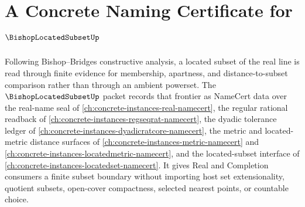 \chapter{A Concrete Naming Certificate for $\BishopLocatedSubsetUp$}
\label{ch:concrete-instances-bishop-located-subset-namecert}

Following Bishop--Bridges constructive analysis, a located subset of the real line is read through finite evidence for membership, apartness, and distance-to-subset comparison rather than through an ambient powerset. The $\BishopLocatedSubsetUp$ packet records that frontier as NameCert data over the real-name seal of \autoref{ch:concrete-instances-real-namecert}, the regular rational readback of \autoref{ch:concrete-instances-regseqrat-namecert}, the dyadic tolerance ledger of \autoref{ch:concrete-instances-dyadicratcore-namecert}, the metric and located-metric distance surfaces of \autoref{ch:concrete-instances-metric-namecert} and \autoref{ch:concrete-instances-locatedmetric-namecert}, and the located-subset interface of \autoref{ch:concrete-instances-locatedset-namecert}. It gives Real and Completion consumers a finite subset boundary without importing host set extensionality, quotient subsets, open-cover compactness, selected nearest points, or countable choice.

